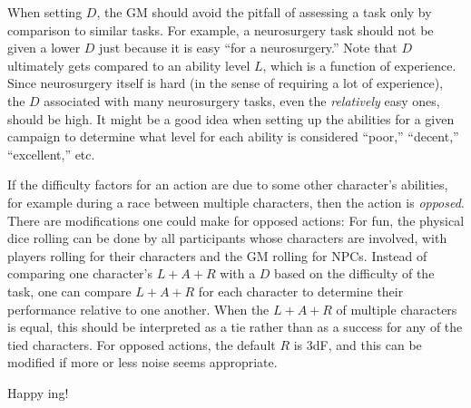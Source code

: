 When setting $D$, the GM should avoid the pitfall of assessing a task only by comparison to similar tasks.
For example, a neurosurgery task should not be given a lower $D$ just because it is easy ``for a neurosurgery.''
Note that $D$ ultimately gets compared to an ability level $L$, which is a function of experience.
Since neurosurgery itself is hard (in the sense of requiring a lot of experience), the $D$ associated with many neurosurgery tasks, even the \emph{relatively} easy ones, should be high.
It might be a good idea when setting up the abilities for a given campaign to determine what level for each ability is considered ``poor,'' ``decent,'' ``excellent,'' etc.

If the difficulty factors for an action are due to some other character's abilities, for example during a race between multiple characters, then the action is \emph{opposed}.
There are modifications one could make for opposed actions:
For fun, the physical dice rolling can be done by all participants whose characters are involved, with players rolling for their characters and the GM rolling for NPCs.
Instead of comparing one character’s $L + A + R$ with a $D$ based on the difficulty of the task, one can compare $L + A + R$ for each character to determine their performance relative to one another.
When the $L + A + R$ of multiple characters is equal, this should be interpreted as a tie rather than as a success for any of the tied characters.
For opposed actions, the default $R$ is $3$dF, and this can be modified if more or less noise seems appropriate.

Happy \peupfudge{}ing!

